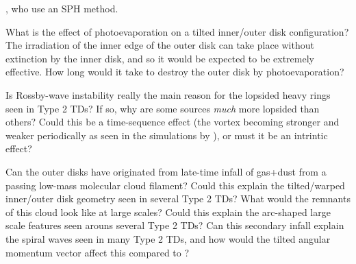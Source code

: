 \documentclass[10pt,fleqn,twoside,a4paper]{article}
\begin{document}
\begin{compactenumerate}
  \citet{2017MNRAS.464.1449R}, who use an SPH method.
\item What is the effect of photoevaporation on a tilted inner/outer disk
  configuration? The irradiation of the inner edge of the outer disk can
  take place without extinction by the inner disk, and so it would be
  expected to be extremely effective. How long would it take to destroy
  the outer disk by photoevaporation?
\item Is Rossby-wave instability really the main reason for the lopsided
  heavy rings seen in Type 2 TDs? If so, why are some sources {\em much}
  more lopsided than others? Could this be a time-sequence effect (the
  vortex becoming stronger and weaker periodically as seen in the
  simulations by \citet{2012MNRAS.419.1701R}), or must it be an intrintic
  effect?
\item Can the outer disks have originated from late-time infall of gas+dust
  from a passing low-mass molecular cloud filament? Could this explain the
  tilted/warped inner/outer disk geometry seen in several Type 2 TDs? What
  would the remnants of this cloud look like at large scales? Could this
  explain the arc-shaped large scale features seen arouns several Type 2
  TDs? Can this secondary infall explain the spiral waves seen in many
  Type 2 TDs, and how would the tilted angular momentum vector 
  affect this compared to \citet{2015A&A...582L...9L}?
\end{compactenumerate}
\end{document}

